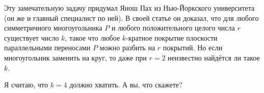 \medskip

Эту замечательную задачу придумал Янош Пах из Нью-Йоркского университета (он же и главный специалист по ней).
В своей статье \cite{46} он доказал, что для любого симметричного многоугольника $P$ и любого положительного целого числа $r$ существует число $k$, такое что любое $k$-кратное покрытие плоскости параллельными переносами $P$ можно разбить на $r$ покрытий.
Но если многоугольник заменить на круг, то даже при $r = 2$ неизвестно найдётся ли такое $k$.

Я считаю, что $k = 4$ должно хватить.
А вы, что скажете?
